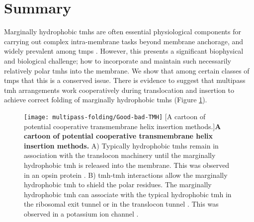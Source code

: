 \section{Summary}

Marginally hydrophobic \gls{tmh}s are often essential physiological components for carrying out complex intra-membrane tasks beyond membrane anchorage, and widely prevalent among \gls{tmp}s \cite{Hessa2007}.
However, this presents a significant biophysical and biological challenge; how to incorporate and maintain such necessarily relatively polar \gls{tmh}s into the membrane.
We show that among certain classes of \gls{tmp}s that this is a conserved issue.
There is evidence to suggest that multipass \gls{tmh} arrangements work cooperatively during translocation and insertion to achieve correct folding of marginally hydrophobic \gls{tmh}s \cite{Ismail2008, Virkki2014, Sadlish2005, Cross2009, Cymer2013, Sato2002, Sato2003, Zhang2007, Cymer2015, Tu2000, Tu2014, Ojemalm2012} (Figure \ref{fig:Good-bad-TMH}).

\begin{figure}[!ht]
\centering
\texttt{[image: multipass-folding/Good-bad-TMH]}
		[A cartoon of potential cooperative transmembrane helix insertion methods.]{\textbf{A cartoon of potential cooperative transmembrane helix insertion methods.}
    A) Typically hydrophobic \gls{tmh}s remain in association with the translocon machinery until the marginally hydrophobic \gls{tmh} is released into the membrane.
    This was observed in an opsin protein \cite{Ismail2008}.
    B) \gls{tmh}\--\gls{tmh} interactions allow the marginally hydrophobic \gls{tmh} to shield the polar residues.
    The marginally hydrophobic \gls{tmh} can associate with the typical hydrophobic \gls{tmh} in the ribosomal exit tunnel \cite{Tu2014} or in the translocon tunnel \cite{Zhang2007}.
    This was observed in a potassium ion channel \cite{Tu2014, Zhang2007, Cymer2015}.
    }

\label{fig:Good-bad-TMH}
\end{figure}

